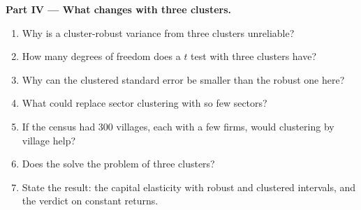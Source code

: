 \begin{problem}
\medskip
\noindent\textbf{Part IV --- What changes with three clusters.}
\begin{enumerate}[resume]
  \item Why is a cluster-robust variance from three clusters unreliable?
  \item How many degrees of freedom does a $t$ test with three clusters have?
  \item Why can the clustered standard error be smaller than the robust one here?
  \item What could replace sector clustering with so few sectors?
  \item If the census had 300 villages, each with a few firms, would clustering by village help?
  \item Does the  solve the problem of three clusters?
  \item State the result: the capital elasticity with robust and clustered intervals, and the verdict on constant returns.
\end{enumerate}
\end{problem}

